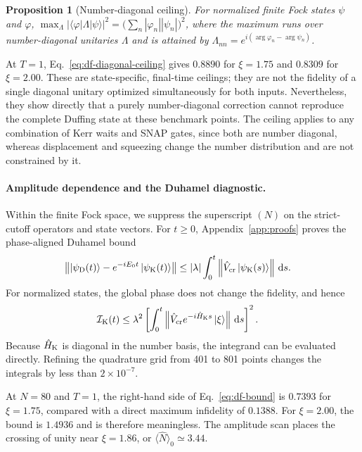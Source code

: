 \documentclass[pra,twocolumn,superscriptaddress,nofootinbib,floatfix]{revtex4-2}
\newtheorem{proposition}{Proposition}
\theoremstyle{remark}
\newcommand{\revcolor}{\color{blue}}
\DeclareRobustCommand{\rev}[1]{{\revcolor #1}}
\begin{document}
\begingroup\revcolor
\begin{proposition}[Number-diagonal ceiling]
\label{prop:diagonal}
For normalized finite Fock states \(\psi\) and \(\varphi\), \(\max_{\Lambda}|\langle\varphi|\Lambda|\psi\rangle|^2=\bigl(\sum_n|\varphi_n||\psi_n|\bigr)^2\), where the maximum runs over number-diagonal unitaries \(\Lambda\) and is attained by \(\Lambda_{nn}=e^{i(\arg\varphi_n-\arg\psi_n)}\).
\end{proposition}
\endgroup

At \(T=1\), Eq.~\eqref{eq:df-diagonal-ceiling} gives \(0.8890\) for \(\xi=1.75\) and \(0.8309\) for \(\xi=2.00\). These are state-specific, final-time ceilings; they are not the fidelity of a single diagonal unitary optimized simultaneously for both inputs. Nevertheless, they show directly that a purely number-diagonal correction cannot reproduce the complete Duffing state at these benchmark points. \rev{The ceiling applies to any combination of Kerr waits and SNAP gates, since both are number diagonal, whereas displacement and squeezing change the number distribution and are not constrained by it.}

\paragraph{Amplitude dependence and the Duhamel diagnostic.}
Within the finite Fock space, we suppress the superscript \((N)\) on the strict-cutoff operators and state vectors. \rev{For \(t\geq0\), Appendix~\ref{app:proofs} proves the phase-aligned Duhamel bound}
\begin{align}
\left\|\ket{\psi_{\rm D}(t)}-e^{-iE_0t}\ket{\psi_{\rm K}(t)}\right\| &\leq |\lambda|\int_0^t\left\|\hat V_{\rm cr}\ket{\psi_{\rm K}(s)}\right\|\,{\rm d}s .
\label{eq:df-duhamel}
\end{align}
For normalized states, the global phase does not change the fidelity, and hence
\begin{align}
\mathcal I_{\rm K}(t) &\leq \lambda^2\left[\int_0^t\left\|\hat V_{\rm cr}e^{-i\hat H_{\rm K}s}\ket{\xi}\right\|\,{\rm d}s\right]^2 .
\label{eq:df-bound}
\end{align}
Because \(\hat H_{\rm K}\) is diagonal in the number basis, the integrand can be evaluated directly. \rev{Refining the quadrature grid from 401 to 801 points changes the integrals by less than \(2\times10^{-7}\).}

At \(N=80\) and \(T=1\), the right-hand side of Eq.~\eqref{eq:df-bound} is \(0.7393\) for \(\xi=1.75\), compared with a direct maximum infidelity of \(0.1388\). For \(\xi=2.00\), the bound is \(1.4936\) and is therefore meaningless. \rev{The amplitude scan places the crossing of unity near \(\xi=1.86\), or \(\langle\hat N\rangle_0\simeq3.44\).}
\end{document}

